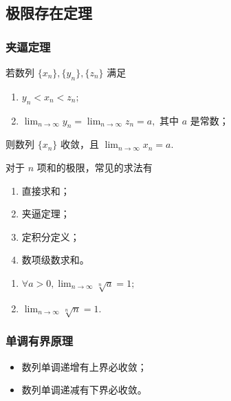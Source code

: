 \subsection{极限存在定理}

\subsubsection{夹逼定理}

\begin{Theo}[夹逼定理]

    若数列 $ \{x_n\},\{y_{n}\},\{z_{n}\} $ 满足
    \begin{enumerate}
        \item $ y_{n}<x_{n}<z_{n}; $ 
        \item $ \displaystyle\lim_{n\rightarrow\infty}
        y_n=\displaystyle\lim_{n\rightarrow\infty}z_n=a, $ 其中 $ a $ 是常数；
    \end{enumerate}
    则数列 $ \{x_n\} $ 收敛，且 $ \displaystyle\lim_{n\rightarrow\infty}x_n=a. $ 
\end{Theo}

对于 $ n $ 项和的极限，常见的求法有
\begin{enumerate}
    \item 直接求和；
    \item 夹逼定理；
    \item 定积分定义；
    \item 数项级数求和。
\end{enumerate}

\begin{Field}[两个常见的极限]

    \begin{enumerate}
        \item $ \forall a>0,\displaystyle\lim_{n\rightarrow\infty}\sqrt[n]{a}=1; $ 
        \item $ \displaystyle\lim_{n\rightarrow\infty}\sqrt[n]{n}=1. $ 
    \end{enumerate}
\end{Field}

\subsubsection{单调有界原理}

\begin{itemize}
    \item 数列单调递增有上界必收敛；
    \item 数列单调递减有下界必收敛。
\end{itemize}


